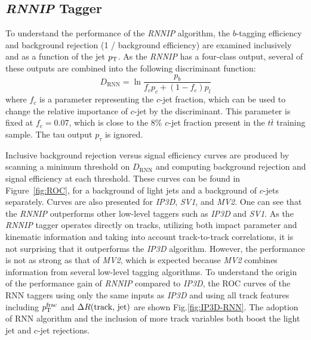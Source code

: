 \subsection{\textit{RNNIP} Tagger}

\label{sec:rnn-result-rnn}

To understand the performance of the \textit{RNNIP} algorithm, the $b$-tagging efficiency and background rejection (1 / background efficiency) are examined inclusively and as a function of the jet $p_{{\rm T}}$. As the \textit{RNNIP} has a four-class output, several of these outputs are combined into the following discriminant function:
\begin{equation}
D_{\mathrm{RNN}} = \ln \frac{p_{b}}{f_c p_c + (1-f_c) p_l}
\end{equation}
where $f_c$ is a parameter representing the $c$-jet fraction, which can be used to change the relative importance of $c$-jet by the discriminant. This parameter is fixed at $f_c=0.07$, which is close to the 8\% $c$-jet fraction present in the $t\bar{t}$ training sample. The tau output $p_\tau$ is ignored.

Inclusive background rejection versus signal efficiency curves are produced by scanning a minimum threshold on $D_{\mathrm{RNN}}$ and computing background rejection and signal efficiency at each threshold. These curves can be found in Figure~\ref{fig:ROC}, for a background of light jets and a background of $c$-jets separately.  Curves are also presented for \textit{IP3D}, \textit{SV1}, and \textit{MV2}. One can see that the \textit{RNNIP} outperforms other low-level taggers such as \textit{IP3D} and \textit{SV1}. As the \textit{RNNIP} tagger operates directly on tracks, utilizing both impact parameter and kinematic information and taking into account track-to-track correlations, it is not surprising that it outperforms the \textit{IP3D} algorithm.  However, the performance is not as strong as that of \textit{MV2}, which is expected because \textit{MV2} combines information from several low-level tagging algorithms. To understand the origin of the performance gain of \textit{RNNIP} compared to \textit{IP3D}, the ROC curves of the RNN taggers using only the same inputs as \textit{IP3D} and using all track features including $p_{\rm T}^{\rm frac}$ and $\Delta R(\text{track, jet})$ are shown Fig.\ref{fig:IP3D-RNN}. The adoption of RNN algorithm and the inclusion of more track variables both boost the light jet and $c$-jet rejections.

